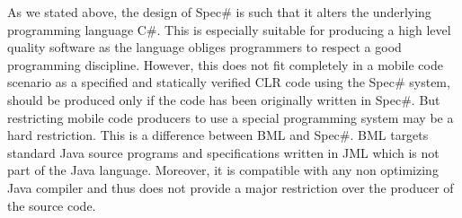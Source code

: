   As we stated above, the design of Spec\# is such that it alters the underlying programming language C\#. This is especially suitable for 
 producing a high level quality software as the language obliges programmers to respect a good programming discipline. However,  this does not fit completely 
 in a mobile code scenario as a specified and statically verified CLR code using the Spec\#  system, should be produced only if the code has been
 originally written in Spec\#. But restricting mobile code producers to use a special
 programming system may be a hard restriction. This is a difference between BML and Spec\#.
 BML targets  standard Java source programs and specifications written in JML which is not part of the Java language. 
 Moreover, it is compatible with any non optimizing Java compiler and thus does not provide a major restriction over the producer of the source code. 


 
 


